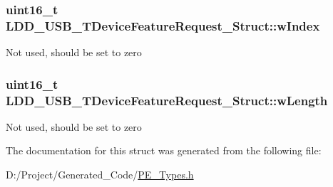 \subsubsection[{w\+Index}]{\setlength{\rightskip}{0pt plus 5cm}uint16\+\_\+t L\+D\+D\+\_\+\+U\+S\+B\+\_\+\+T\+Device\+Feature\+Request\+\_\+\+Struct\+::w\+Index}\label{struct_l_d_d___u_s_b___t_device_feature_request___struct_a261267b70741fe26898665df42fec10b}
Not used, should be set to zero \hypertarget{struct_l_d_d___u_s_b___t_device_feature_request___struct_af0c222aa4585a132b2582fb1c290edc7}{}
\subsubsection[{w\+Length}]{\setlength{\rightskip}{0pt plus 5cm}uint16\+\_\+t L\+D\+D\+\_\+\+U\+S\+B\+\_\+\+T\+Device\+Feature\+Request\+\_\+\+Struct\+::w\+Length}\label{struct_l_d_d___u_s_b___t_device_feature_request___struct_af0c222aa4585a132b2582fb1c290edc7}
Not used, should be set to zero 

The documentation for this struct was generated from the following file\+:\begin{DoxyCompactItemize}
\item 
D\+:/\+Project/\+Generated\+\_\+\+Code/\hyperlink{_p_e___types_8h}{P\+E\+\_\+\+Types.\+h}\end{DoxyCompactItemize}
